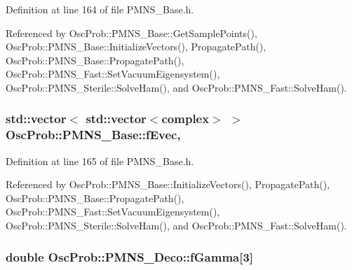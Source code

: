Definition at line 164 of file P\+M\+N\+S\+\_\+\+Base.\+h.



Referenced by Osc\+Prob\+::\+P\+M\+N\+S\+\_\+\+Base\+::\+Get\+Sample\+Points(), Osc\+Prob\+::\+P\+M\+N\+S\+\_\+\+Base\+::\+Initialize\+Vectors(), Propagate\+Path(), Osc\+Prob\+::\+P\+M\+N\+S\+\_\+\+Base\+::\+Propagate\+Path(), Osc\+Prob\+::\+P\+M\+N\+S\+\_\+\+Fast\+::\+Set\+Vacuum\+Eigensystem(), Osc\+Prob\+::\+P\+M\+N\+S\+\_\+\+Sterile\+::\+Solve\+Ham(), and Osc\+Prob\+::\+P\+M\+N\+S\+\_\+\+Fast\+::\+Solve\+Ham().

\subsubsection[{\texorpdfstring{f\+Evec}{fEvec}}]{\setlength{\rightskip}{0pt plus 5cm}std\+::vector$<$ std\+::vector$<${\bf complex}$>$ $>$ Osc\+Prob\+::\+P\+M\+N\+S\+\_\+\+Base\+::f\+Evec\hspace{0.3cm}{\ttfamily [protected]}, {\ttfamily [inherited]}}\hypertarget{classOscProb_1_1PMNS__Base_a093e7bd31d4ef52ed52df414e12c1d17}{}\label{classOscProb_1_1PMNS__Base_a093e7bd31d4ef52ed52df414e12c1d17}


Definition at line 165 of file P\+M\+N\+S\+\_\+\+Base.\+h.



Referenced by Osc\+Prob\+::\+P\+M\+N\+S\+\_\+\+Base\+::\+Initialize\+Vectors(), Propagate\+Path(), Osc\+Prob\+::\+P\+M\+N\+S\+\_\+\+Base\+::\+Propagate\+Path(), Osc\+Prob\+::\+P\+M\+N\+S\+\_\+\+Fast\+::\+Set\+Vacuum\+Eigensystem(), Osc\+Prob\+::\+P\+M\+N\+S\+\_\+\+Sterile\+::\+Solve\+Ham(), and Osc\+Prob\+::\+P\+M\+N\+S\+\_\+\+Fast\+::\+Solve\+Ham().

\subsubsection[{\texorpdfstring{f\+Gamma}{fGamma}}]{\setlength{\rightskip}{0pt plus 5cm}double Osc\+Prob\+::\+P\+M\+N\+S\+\_\+\+Deco\+::f\+Gamma\mbox{[}3\mbox{]}\hspace{0.3cm}{\ttfamily [protected]}}\hypertarget{classOscProb_1_1PMNS__Deco_ae2f30ac9f8b25344959f1698616d337a}{}\label{classOscProb_1_1PMNS__Deco_ae2f30ac9f8b25344959f1698616d337a}


